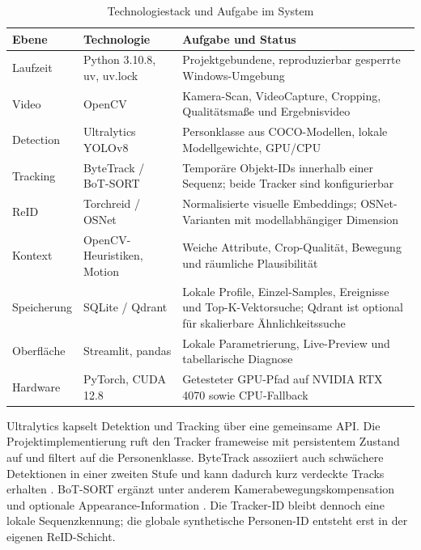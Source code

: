 \begin{table}[H]
  \centering
  \small
  \caption{Technologiestack und Aufgabe im System}
  \label{tab:tech}
  \begin{tabularx}{\textwidth}{L{31mm}L{39mm}Y}
    \toprule
    \textbf{Ebene} & \textbf{Technologie} & \textbf{Aufgabe und Status} \\
    \midrule
    Laufzeit & Python 3.10.8, uv, uv.lock & Projektgebundene, reproduzierbar gesperrte Windows-Umgebung \\
    Video & OpenCV & Kamera-Scan, VideoCapture, Cropping, Qualitätsmaße und Ergebnisvideo \\
    Detection & Ultralytics YOLOv8 & Personklasse aus COCO-Modellen, lokale Modellgewichte, GPU/CPU \\
    Tracking & ByteTrack / BoT-SORT & Temporäre Objekt-IDs innerhalb einer Sequenz; beide Tracker sind konfigurierbar \citep{zhang2022bytetrack,aharon2022botsort} \\
    ReID & Torchreid / OSNet & Normalisierte visuelle Embeddings; OSNet-Varianten mit modellabhängiger Dimension \citep{zhou2019osnet} \\
    Kontext & OpenCV-Heuristiken, Motion & Weiche Attribute, Crop-Qualität, Bewegung und räumliche Plausibilität \\
    Speicherung & SQLite / Qdrant & Lokale Profile, Einzel-Samples, Ereignisse und Top-K-Vektorsuche; Qdrant ist optional für skalierbare Ähnlichkeitssuche \citep{qdrant2026vectors} \\
    Oberfläche & Streamlit, pandas & Lokale Parametrierung, Live-Preview und tabellarische Diagnose \\
    Hardware & PyTorch, CUDA 12.8 & Getesteter GPU-Pfad auf NVIDIA RTX 4070 sowie CPU-Fallback \\
    \bottomrule
  \end{tabularx}
\end{table}

Ultralytics kapselt Detektion und Tracking über eine gemeinsame API. Die
Projektimplementierung ruft den Tracker frameweise mit persistentem Zustand
auf und filtert auf die Personenklasse. ByteTrack assoziiert auch schwächere
Detektionen in einer zweiten Stufe und kann dadurch kurz verdeckte Tracks
erhalten \citep{zhang2022bytetrack}. BoT-SORT ergänzt unter anderem
Kamerabewegungskompensation und optionale Appearance-Information
\citep{aharon2022botsort}. Die Tracker-ID bleibt dennoch eine lokale
Sequenzkennung; die globale synthetische Personen-ID entsteht erst in der
eigenen ReID-Schicht.


